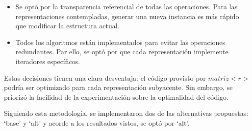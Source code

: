 \vspace{1em}
\begin{itemize}
    \item Se optó por la transparencia referencial de todas las operaciones. Para las representaciones contempladas, generar una nueva instancia es más rápido que modificar la estructura actual.
    \item Todos los algoritmos están implementados para evitar las operaciones redundantes. Par ello, se optó por que cada representación implemente iteradores específicos.
\end{itemize}

\vspace{1em}
Estas decisiones tienen una clara desventaja: el código provisto por $matriz<r>$ podría ser optimizado para cada representación subyacente. Sin embargo, se priorizó la facilidad de la experimentación sobre la optimalidad del código.

\vspace{1em}
Siguiendo esta metodología, se implementaron dos de las alternativas propuestas: `base' y `alt' y acorde a los resultados vistos, se optó por `alt'.
